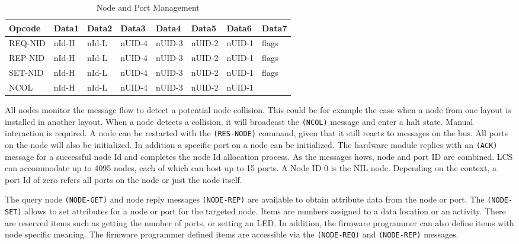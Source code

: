 \begin{table}[ht!]
    \begin{center}
        \caption{Node and Port Management}
        \begin{tabular}{|l|l|l|l|l|l|l|l|}
            \toprule
            \textbf{Opcode} & \textbf{Data1} & \textbf{Data2} & \textbf{Data3} & \textbf{Data4} & \textbf{Data5} & \textbf{Data6} & \textbf{Data7} \\
            \midrule
            REQ-NID & nId-H & nId-L & nUID-4 & nUID-3 & nUID-2 & nUID-1 & flags \\
            REP-NID & nId-H & nId-L & nUID-4 & nUID-3 & nUID-2 & nUID-1 & flags \\
            SET-NID & nId-H & nId-L & nUID-4 & nUID-3 & nUID-2 & nUID-1 & flags \\
            NCOL    & nId-H & nId-L & nUID-4 & nUID-3 & nUID-2 & nUID-1 & \\
            \bottomrule
        \end{tabular}
    \end{center}
\end{table}


All nodes monitor the message flow to detect a potential node collision. This could be for example the case when a node from one layout is installed in another layout. When a node detects a collision, it will broadcast the \texttt{(NCOL)} message and enter a halt state. Manual interaction is required. A node can be restarted with the \texttt{(RES-NODE)} command, given that it still reacts to messages on the bus. All ports on the node will also be initialized. In addition a specific port on a node can be initialized. The hardware module replies with an \texttt{(ACK)} message for a successful node Id and completes the node Id allocation process. As the messages hows, node and port ID are combined. LCS can accommodate up to 4095 nodes, each of which can host up to 15 ports. A Node ID 0 is the NIL node. Depending on the context, a port Id of zero refers all ports on the node or just the node itself.

The query node \texttt{(NODE-GET)} and node reply messages \texttt{(NODE-REP)} are available to obtain attribute data from the node or port. The \texttt{(NODE-SET)} allows to set attributes for a node or port for the targeted node. Items are numbers assigned to a data location or an activity. There are reserved items such as getting the number of ports, or setting an LED. In addition, the firmware programmer can also define items with node specific meaning. The firmware programmer defined items are accessible via the \texttt{(NODE-REQ)} and \texttt{(NODE-REP)} messages.

